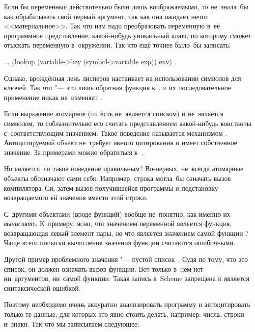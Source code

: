 Если бы переменные действительно были лишь воображаемыми, то 
не~знала~бы как обрабатывать свой первый аргумент, так как она ожидает нечто
<<материальное>>. Так что нам надо преобразовать переменную в~её программное
представление, какой-нибудь уникальный ключ, по которому  сможет
отыскать переменную в~окружении. Так что ещё точнее было~бы записать:


\begin{code:lisp}
... (lookup (variable->key (symbol->variable exp)) env) ...
\end{code:lisp}


Однако, врождённая лень лисперов настаивает на использовании символов для
ключей. Так что  "--- это лишь обратная функция
к~, и их последовательное применение
никак не~изменяет~.

Если выражение атомарное (то~есть не~является списком) и не~является символом,
то соблазнительно его считать представлением какой-нибудь константы
с~соответствующим значением. Такое поведение называется механизмом
. Автоцитируемый объект не~требует явного цитирования и
имеет собственное значение. За примерами можно обратиться к~\cite{cha96}.

Но является~ли такое поведение правильным? Во-первых, не~всегда атомарные
объекты обозначают сами себя. Например, строка  могла~бы означать
вызов компилятора~Си, затем вызов получившейся программы и подстановку
возвращаемого ей значения вместо этой строки.

С~другими объектами (вроде функций) вообще не~понятно, как именно их
\emph{вычислять}. К~примеру, ясно, что значением переменной  является
функция, возвращающая левый элемент пары, но что является значением самой
функции ? Чаще всего попытки вычисления значения функции считаются
ошибочными.

\indexC{()}
Другой пример проблемного значения "--- пустой список~\ic{()}. Судя по тому, что
это список, он должен означать вызов функции. Вот только в~нём нет
ни~аргументов, ни~самой функции. Такая запись в~Scheme запрещена и является
синтаксической ошибкой.

Поэтому необходимо очень аккуратно анализировать программу и автоцитировать
только те данные, для которых это явно стоить делать, например: числа, строки
и~знаки.  Так что мы записываем
следующее:

